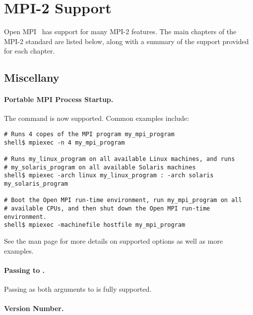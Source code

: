 \section{MPI-2 Support}

Open MPI \lamversion\ has support for many MPI-2 features.  The main
chapters of the MPI-2 standard are listed below, along with a summary
of the support provided for each chapter.


\subsection{Miscellany}


\paragraph{Portable MPI Process Startup.}

The  command is now supported.  Common examples include:

\lstset{style=lam-shell}
\begin{lstlisting}
# Runs 4 copes of the MPI program my_mpi_program
shell$ mpiexec -n 4 my_mpi_program

# Runs my_linux_program on all available Linux machines, and runs
# my_solaris_program on all available Solaris machines
shell$ mpiexec -arch linux my_linux_program : -arch solaris my_solaris_program

# Boot the Open MPI run-time environment, run my_mpi_program on all
# available CPUs, and then shut down the Open MPI run-time environment.
shell$ mpiexec -machinefile hostfile my_mpi_program
\end{lstlisting}

See the  man page for more details on supported
options as well as more examples.


\paragraph{Passing  to .}

Passing  as both arguments to  is
fully supported.


\paragraph{Version Number.}

